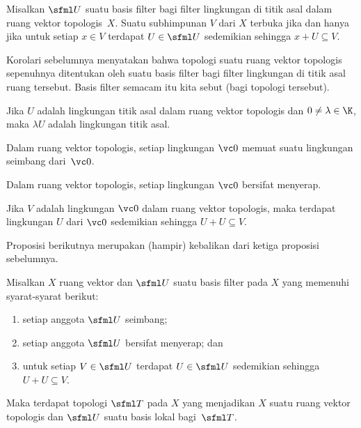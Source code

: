 \begin{cor} Misalkan $\sfml U$ suatu basis filter bagi filter lingkungan di titik asal dalam ruang vektor topologis~$X$.  Suatu subhimpunan $V$ dari $X$
terbuka jika dan hanya jika untuk setiap $x \in V$ terdapat $U \in \sfml U$ sedemikian sehingga $x + U \subseteq V$.
\end{cor}

Korolari sebelumnya menyatakan bahwa topologi suatu ruang vektor topologis sepenuhnya ditentukan oleh suatu basis filter bagi
filter lingkungan di titik asal ruang tersebut.  Basis filter semacam itu kita sebut
 (bagi topologi tersebut).

\begin{prop} Jika $U$ adalah lingkungan titik asal dalam ruang vektor topologis dan $0 \ne \lambda \in \K$, maka $\lambda U$ adalah
lingkungan titik asal.
\end{prop}

\begin{prop} Dalam ruang vektor topologis, setiap lingkungan $\vc 0$ memuat suatu lingkungan seimbang dari~$\vc 0$.
\end{prop}

\begin{prop} Dalam ruang vektor topologis, setiap lingkungan $\vc 0$ bersifat menyerap.
\end{prop}

\begin{prop} Jika $V$ adalah lingkungan $\vc 0$ dalam ruang vektor topologis, maka terdapat lingkungan $U$ dari $\vc 0$
sedemikian sehingga $U + U \subseteq V$.
\end{prop}

Proposisi berikutnya merupakan (hampir) kebalikan dari ketiga proposisi sebelumnya.

\begin{prop}\label{prop_fbase_induces_top} Misalkan $X$ ruang vektor dan $\sfml U$ suatu basis filter pada $X$ yang memenuhi syarat-syarat berikut:
   \begin{enumerate}[label=\rm{(\alph*)}]
     \item setiap anggota $\sfml U$ seimbang;
     \item setiap anggota $\sfml U$ bersifat menyerap; dan
     \item untuk setiap $V \in \sfml U$ terdapat $U \in \sfml U$ sedemikian sehingga $U + U \subseteq V$.
   \end{enumerate}
Maka terdapat topologi $\sfml T$ pada $X$ yang menjadikan $X$ suatu ruang vektor topologis dan $\sfml U$ suatu basis lokal bagi~$\sfml T$.
\end{prop}

